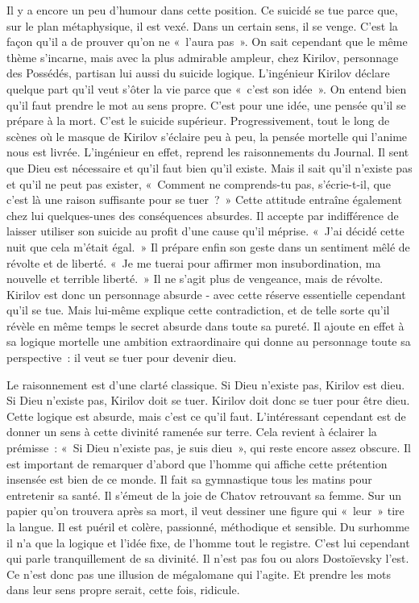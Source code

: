 \documentclass{book}
\begin{document}
Il y a encore un peu d'humour dans cette position. Ce suicidé se tue parce que, sur le plan métaphysique, il est vexé. Dans un certain sens, il se venge. C'est la façon qu'il a de prouver qu'on ne « l'aura pas ». On sait cependant que le même thème s'incarne, mais avec la plus admirable ampleur, chez Kirilov, personnage des Possédés, partisan lui aussi du suicide logique. L'ingénieur Kirilov déclare quelque part qu'il veut s'ôter la vie parce que « c'est son idée ». On entend bien qu'il faut prendre le mot au sens propre. C'est pour une idée, une pensée qu'il se prépare à la mort. C'est le suicide supérieur. Progressivement, tout le long de scènes où le masque de Kirilov s'éclaire peu à peu, la pensée mortelle qui l'anime nous est livrée. L'ingénieur en effet, reprend les raisonnements du Journal. Il sent que Dieu est nécessaire et qu'il faut bien qu'il existe. Mais il sait qu'il n'existe pas et qu'il ne peut pas exister, « Comment ne comprends-tu pas, s'écrie-t-il, que c'est là une raison suffisante pour se tuer ? » Cette attitude entraîne également chez lui quelques-unes des conséquences absurdes. Il accepte par indifférence de laisser utiliser son suicide au profit d'une cause qu'il méprise. « J'ai décidé cette nuit que cela m'était égal. » Il prépare enfin son geste dans un sentiment mêlé de révolte et de liberté. « Je me tuerai pour affirmer mon insubordination, ma nouvelle et terrible liberté. » Il ne s'agit plus de vengeance, mais de révolte. Kirilov est donc un personnage absurde ‑ avec cette réserve essentielle cependant qu'il se tue. Mais lui‑même explique cette contradiction, et de telle sorte qu'il révèle en même temps le secret absurde dans toute sa pureté. Il ajoute en effet à sa logique mortelle une ambition extraordinaire qui donne au personnage toute sa perspective : il veut se tuer pour devenir dieu.

Le raisonnement est d'une clarté classique. Si Dieu n'existe pas, Kirilov est dieu. Si Dieu n'existe pas, Kirilov doit se tuer. Kirilov doit donc se tuer pour être dieu. Cette logique est absurde, mais c'est ce qu'il faut. L'intéressant cependant est de donner un sens à cette divinité ramenée sur terre. Cela revient à éclairer la prémisse : « Si Dieu n'existe pas, je suis dieu », qui reste encore assez obscure. Il est important de remarquer d'abord que l'homme qui affiche cette prétention insensée est bien de ce monde. Il fait sa gymnastique tous les matins pour entretenir sa santé. Il s'émeut de la joie de Chatov retrouvant sa femme. Sur un papier qu'on trouvera après sa mort, il veut dessiner une figure qui « leur » tire la langue. Il est puéril et colère, passionné, méthodique et sensible. Du surhomme il n'a que la logique et l'idée fixe, de l'homme tout le registre. C'est lui cependant qui parle tranquillement de sa divinité. Il n'est pas fou ou alors Dostoïevsky l'est. Ce n'est donc pas une illusion de mégalomane qui l'agite. Et prendre les mots dans leur sens propre serait, cette fois, ridicule.
\end{document}
